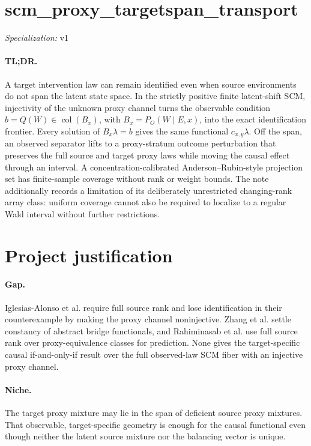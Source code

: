 \documentclass{article}
\begin{document}
\sloppy

\section*{scm\_\allowbreak{}proxy\_\allowbreak{}targetspan\_\allowbreak{}transport}

\noindent\textit{Specialization:} v1\par

\paragraph{TL;DR.} A target intervention law can remain identified even when source environments do not span the latent state space. In the strictly positive finite latent-shift SCM, injectivity of the unknown proxy channel turns the observable condition \(b=Q(W)\in\operatorname{col}(B_x)\), with \(B_x=P_O(W\mid E,x)\), into the exact identification frontier. Every solution of \(B_x\lambda=b\) gives the same functional \(c_{x,y}\lambda\). Off the span, an observed separator lifts to a proxy-stratum outcome perturbation that preserves the full source and target proxy laws while moving the causal effect through an interval. A concentration-calibrated Anderson--Rubin-style projection set has finite-sample coverage without rank or weight bounds. The note additionally records a limitation of its deliberately unrestricted changing-rank array class: uniform coverage cannot also be required to localize to a regular Wald interval without further restrictions.

\section{Project justification}

\paragraph{Gap.} Iglesias-Alonso et al. require full source rank and lose identification in their counterexample by making the proxy channel noninjective. Zhang et al. settle constancy of abstract bridge functionals, and Rahiminasab et al. use full source rank over proxy-equivalence classes for prediction. None gives the target-specific causal if-and-only-if result over the full observed-law SCM fiber with an injective proxy channel.

\paragraph{Niche.} The target proxy mixture may lie in the span of deficient source proxy mixtures. That observable, target-specific geometry is enough for the causal functional even though neither the latent source mixture nor the balancing vector is unique.
\end{document}
